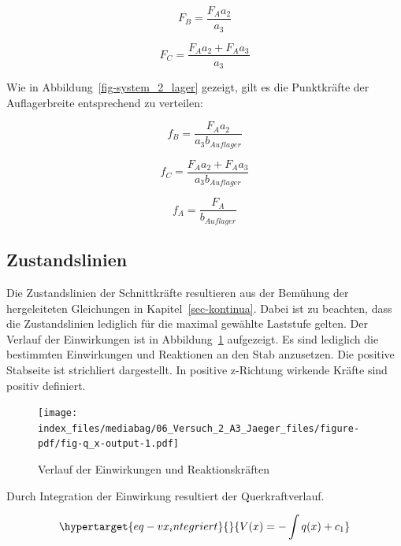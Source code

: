 \documentclass[
  letterpaper,
]{scrreprt}
\begin{document}
\begin{equation}F_{B} = \frac{F_{A} a_{2}}{a_{3}}\end{equation}

\begin{equation}F_{C} = \frac{F_{A} a_{2} + F_{A} a_{3}}{a_{3}}\end{equation}

Wie in Abbildung~\ref{fig-system_2_lager} gezeigt, gilt es die
Punktkräfte der Auflagerbreite entsprechend zu verteilen:

\begin{equation}f_{B} = \frac{F_{A} a_{2}}{a_{3} b_{Auflager}}\end{equation}

\begin{equation}f_{C} = \frac{F_{A} a_{2} + F_{A} a_{3}}{a_{3} b_{Auflager}}\end{equation}

\begin{equation}f_{A} = \frac{F_{A}}{b_{Auflager}}\end{equation}

\hypertarget{zustandslinien}{%
\subsection{Zustandslinien}\label{zustandslinien}}

Die Zustandslinien der Schnittkräfte resultieren aus der Bemühung der
hergeleiteten Gleichungen in Kapitel~\ref{sec-kontinua}. Dabei ist zu
beachten, dass die Zustandslinien lediglich für die maximal gewählte
Laststufe gelten. Der Verlauf der Einwirkungen ist in
Abbildung~\ref{fig-q_x} aufgezeigt. Es sind lediglich die bestimmten
Einwirkungen und Reaktionen an den Stab anzusetzen. Die positive
Stabseite ist strichliert dargestellt. In positive z-Richtung wirkende
Kräfte sind positiv definiert.

\begin{figure}[H]

{\centering \texttt{[image: index\_files/mediabag/06\_Versuch\_2\_A3\_Jaeger\_files/figure-pdf/fig-q\_x-output-1.pdf]}

}

\caption{\label{fig-q_x}Verlauf der Einwirkungen und Reaktionskräften}

\end{figure}

Durch Integration der Einwirkung resultiert der Querkraftverlauf.

\begin{equation}\protect\hypertarget{eq-vx_integriert}{}{
V(x) = -\int q(x) + c_1
}\label{eq-vx_integriert}\end{equation}
\end{document}
